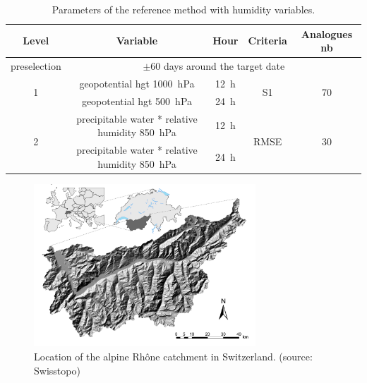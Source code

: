 \documentclass[twocol]{ametsoc}
\begin{document}
\begin{table}[htbp]
	\footnotesize
	\caption{Parameters of the reference method with humidity variables.}
	\begin{center}
		\begin{tabular}{ccccc}
			\hline \textbf{Level} & \textbf{Variable} & \textbf{Hour} & \textbf{Criteria} & \textbf{Analogues nb} \\ 
			\hline 
			preselection & \multicolumn{4}{c}{$\pm 60$ days around the target date} \\
			\hline 
			\multirow{2}{*}{1} & geopotential hgt 1000~hPa & 12~h & \multirow{2}{*}{S1} & \multirow{2}{*}{70} \\
			& geopotential hgt 500~hPa & 24~h & & \\ 
			\hline
			\multirow{2}{*}{2} & precipitable water * relative humidity 850~hPa & 12~h & \multirow{2}{*}{RMSE} & \multirow{2}{*}{30} \\
			& precipitable water * relative humidity 850~hPa & 24~h & & \\ 
			\hline 
		\end{tabular} 
	\end{center}
	\label{table_params_R2}
\end{table}


%


\begin{figure}[htb]
	\centerline{\includegraphics[width=8.3cm]{figure_map.pdf}}
	\caption{Location of the alpine Rhône catchment in Switzerland. (source: Swisstopo)}
	\label{figure_map}
\end{figure}
\end{document}
